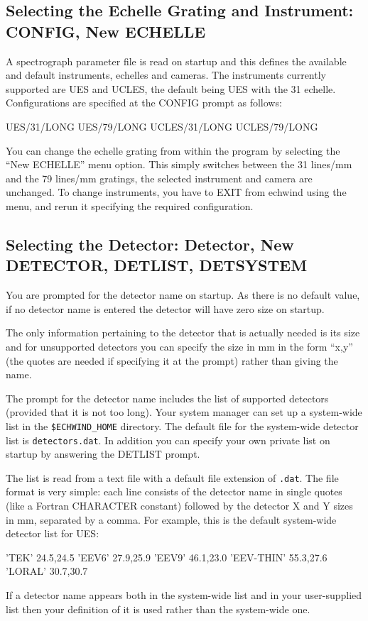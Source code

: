 \documentclass[11pt,nolof,noabs]{starlink}
\begin{document}
\subsection{Selecting the Echelle Grating and Instrument: CONFIG, New ECHELLE}

A spectrograph parameter file is read on startup and this
defines the available and default instruments, echelles and cameras.
The instruments currently supported are UES and UCLES, the default being
UES with the 31 echelle. Configurations are specified at the CONFIG prompt
as follows:

\begin{terminalv}
UES/31/LONG
UES/79/LONG
UCLES/31/LONG
UCLES/79/LONG
\end{terminalv}

You can change the echelle grating from within the program by selecting the
``New ECHELLE'' menu option. This simply switches between the 31 lines/mm and
the 79 lines/mm gratings, the selected instrument and camera are unchanged.
To change instruments, you have to EXIT from echwind using the menu, and
rerun it specifying the required configuration.

\subsection{Selecting the Detector: Detector, New DETECTOR, DETLIST, DETSYSTEM}

You are prompted for the detector name on startup. As there is no default
value, if no detector name is entered the detector will have zero size on
startup.

The only information pertaining to the detector that is actually needed is its
size and for unsupported detectors you can specify the size in mm in the form
``x,y'' (the quotes are needed if specifying it at the prompt) rather
than giving the name.

The prompt for the detector name includes the list of supported detectors
(provided that it is not too long). Your system manager can set up a
system-wide list in the \texttt{\$ECHWIND\_HOME} directory.
The default file for the system-wide detector list is \texttt{detectors.dat}.
In addition you can specify your own private list on
startup by answering the DETLIST prompt.

The list is read from a text file with a default file extension of \texttt{.dat}.
The file format is very simple: each line
consists of the detector name in single quotes (like a Fortran CHARACTER
constant) followed by the detector X and Y sizes in mm, separated by a
comma. For example, this is the default system-wide detector list for UES:
\begin{terminalv}
'TEK'           24.5,24.5
'EEV6'          27.9,25.9
'EEV9'          46.1,23.0
'EEV-THIN'      55.3,27.6
'LORAL'         30.7,30.7
\end{terminalv}
If a detector name appears both in the system-wide list and in your
user-supplied list then your definition of it is used rather than the
system-wide one.
\end{document}
